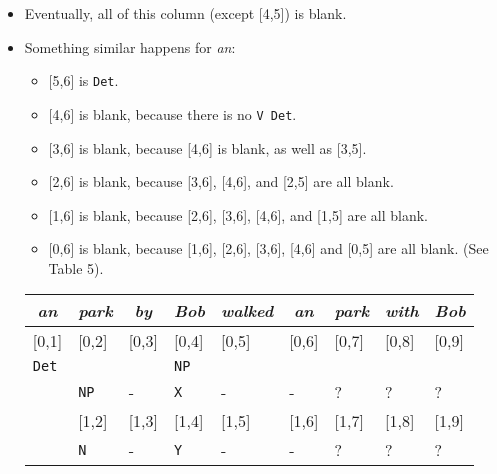 \documentclass[a4paper]{article}
\begin{document}
\begin{enumerate}
\begin{enumerate}
\begin{enumerate}
\begin{itemize}
\begin{itemize}
\end{itemize}
\item Eventually, all of this column (except [4,5]) is blank. 
\item Something similar happens for \textit{an}:
\begin{itemize}
\item{} [5,6] is \texttt{Det}.
\item{} [4,6] is blank, because there is no \texttt{V Det}.
\item{} [3,6] is blank, because [4,6] is blank, as well as [3,5].
\item{} [2,6] is blank, because [3,6], [4,6], and [2,5] are all blank.
\item{} [1,6] is blank, because [2,6], [3,6], [4,6], and [1,5] are all blank.
\item{} [0,6] is blank, because [1,6], [2,6], [3,6], [4,6] and [0,5] are all blank. (See Table 5).
\end{itemize}
\begin{table}[hp]
\centering
\begin{tabular}{ccccccccc}
\textit{an} & \textit{park} & \textit{by} & \textit{Bob} & \textit{walked} & \textit{an} & \textit{park} & \textit{with} & \textit{Bob}\\
\hline
\multicolumn{1}{|l|}{[0,1]} & \multicolumn{1}{l|}{[0,2]} & \multicolumn{1}{l|}{[0,3]} & \multicolumn{1}{l|}{[0,4]} & \multicolumn{1}{l|}{[0,5]} & \multicolumn{1}{l|}{[0,6]} & \multicolumn{1}{l|}{[0,7]} & \multicolumn{1}{l|}{[0,8]} & \multicolumn{1}{l|}{[0,9]} \\
\multicolumn{1}{|l|}{\texttt{Det}} & \multicolumn{1}{l|}{} & \multicolumn{1}{l|}{} & \multicolumn{1}{l|}{\texttt{NP}} & \multicolumn{1}{l|}{} & \multicolumn{1}{l|}{} & \multicolumn{1}{l|}{} & \multicolumn{1}{l|}{} & \multicolumn{1}{l|}{} \\
\multicolumn{1}{|l|}{} & \multicolumn{1}{l|}{\texttt{NP}} & \multicolumn{1}{l|}{-} & \multicolumn{1}{l|}{\texttt{X}} & \multicolumn{1}{l|}{-} & \multicolumn{1}{l|}{-} & \multicolumn{1}{l|}{?} & \multicolumn{1}{l|}{?} & \multicolumn{1}{l|}{?} \\
\hline
 & \multicolumn{1}{|l|}{[1,2]} & \multicolumn{1}{l|}{[1,3]} & \multicolumn{1}{l|}{[1,4]} & \multicolumn{1}{l|}{[1,5]} & \multicolumn{1}{l|}{[1,6]} & \multicolumn{1}{l|}{[1,7]} & \multicolumn{1}{l|}{[1,8]} & \multicolumn{1}{l|}{[1,9]} \\
 & \multicolumn{1}{|l|}{\texttt{N}} & \multicolumn{1}{l|}{-} & \multicolumn{1}{l|}{\texttt{Y}} & \multicolumn{1}{l|}{-} & \multicolumn{1}{l|}{-} & \multicolumn{1}{l|}{?} & \multicolumn{1}{l|}{?} & \multicolumn{1}{l|}{?} \\

\end{tabular}
\end{table}
\end{itemize}
\end{enumerate}
\end{enumerate}
\end{enumerate}
\end{document}
